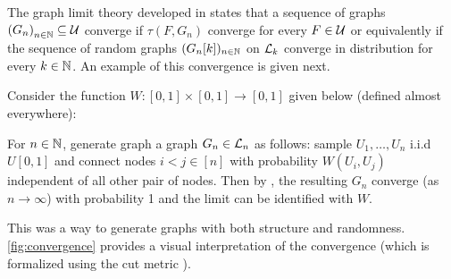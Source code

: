 \documentclass{article}
\begin{document}
The graph limit theory developed in \cite{lovasz04} states that a sequence of graphs $\left( G_n \right)_{n \in \N} \subseteq \Ug$ converge if $\tau(F, G_n)$ converge for every $F \in \Ug$ or equivalently if the sequence of random graphs $(G_n[k])_{n \in \N}$ on $\Lg_{k}$ converge in distribution for every $k \in \N$. An example of this convergence is given next.

\newcommand{\p}{0.5}
\begin{example}
  Consider the function $W: [0,1] \times [0,1] \to [0,1]$ given below (defined almost everywhere):


  For $n \in \N$, generate graph a graph $G_n \in \Lg_{n}$ as follows: sample $U_1,\dots,U_n$ i.i.d $U[0,1]$ and connect nodes $i < j \in [n]$ with probability $W(U_i, U_j)$ independent of all other pair of nodes. Then by \cite[p.~185]{lovasz-book}, the resulting $G_n$ converge (as $n \to \infty$) with probability 1 and the limit can be identified with $W$. 

  This was a way to generate graphs with both structure and randomness. \autoref{fig:convergence} provides a visual interpretation of the convergence (which is formalized using the cut metric \cite[p.~127]{lovasz-book}).
\end{example}
\end{document}
